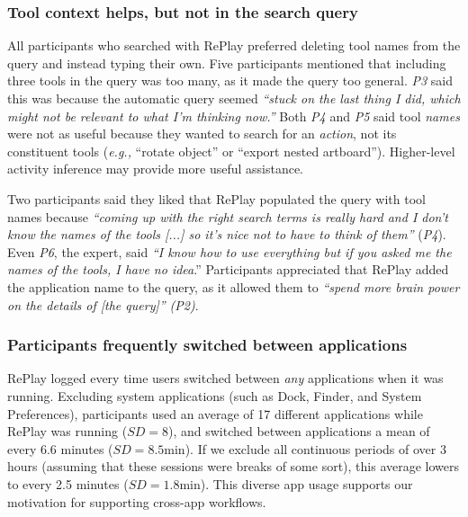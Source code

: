 \subsubsection{Tool context helps, but not in the search query}
All participants who searched with RePlay preferred deleting tool names from the query and instead typing their own. Five participants mentioned that including three tools in the query was too many, as it made the query too general. \textit{P3} said this was because the automatic query seemed \textit{``stuck on the last thing I did, which might not be relevant to what I'm thinking now.''} Both \textit{P4} and \textit{P5} said tool \textit{names} were not as useful because they wanted to search for an \textit{action}, not its constituent tools (\textit{e.g.,} ``rotate object'' or ``export nested artboard''). Higher-level activity inference may provide more useful assistance.

Two participants said they liked that RePlay populated the query with tool names because \textit{``coming up with the right search terms is really hard and I don't know the names of the tools [...] so it's nice not to have to think of them''} (\textit{P4}). Even \textit{P6}, the expert, said \textit{``I know how to use everything but if you asked me the names of the tools, I have no idea}.'' Participants appreciated that RePlay added the application name to the query, as it allowed them to \textit{``spend more brain power on the details of [the query]'' (P2)}. 

\subsubsection{Participants frequently switched between applications}
RePlay logged every time users switched between \textit{any} applications when it was running. Excluding system applications (such as Dock, Finder, and System Preferences), participants used an average of 17 different applications while RePlay was running ($SD\!=\!8$), and switched between applications a mean of every 6.6 minutes ($SD\!=\!8.5$min). If we exclude all continuous periods of over 3 hours (assuming that these sessions were breaks of some sort), this average lowers to every 2.5 minutes ($SD\!=\!1.8$min). This diverse app usage supports our motivation for supporting cross-app workflows.

